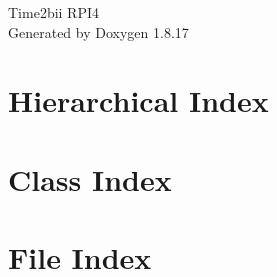 \let\mypdfximage\pdfximage\def\pdfximage{\immediate\mypdfximage}\documentclass[twoside]{book}
\newcommand{\+}{\discretionary{\mbox{\scriptsize$\hookleftarrow$}}{}{}}
\newcommand{\clearemptydoublepage}{%
  \newpage{\pagestyle{empty}\cleardoublepage}%
}
\begin{document}
\hypersetup{pageanchor=false,
             bookmarksnumbered=true,
             pdfencoding=unicode
            }
\begin{titlepage}
\vspace*{7cm}
\begin{center}%
{\Large Time2bii R\+P\+I4 }\\
\vspace*{1cm}
{\large Generated by Doxygen 1.8.17}\\
\end{center}
\end{titlepage}
\clearemptydoublepage
{}
\tableofcontents
\clearemptydoublepage
{}
\hypersetup{pageanchor=true}

\chapter{Hierarchical Index}

\chapter{Class Index}

\chapter{File Index}

\end{document}
